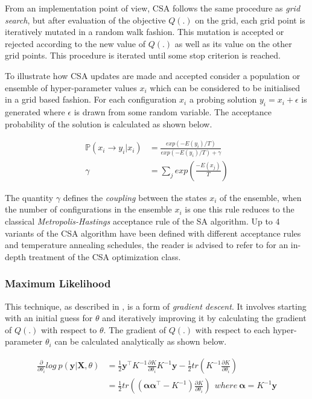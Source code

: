 \documentclass{article}
\begin{document}
From an implementation point of view, CSA follows the same procedure
as \emph{grid search}, but after evaluation of the objective $Q(.)$ on
the grid, each grid point is iteratively mutated in a random walk
fashion. This mutation is accepted or rejected according to the new
value of $Q(.)$ as well as its value on the other grid points. This
procedure is iterated until some stop criterion is reached.

To illustrate how CSA updates are made and accepted consider a
population or ensemble of hyper-parameter values ${x_i}$ which can be
considered to be initialised in a grid based fashion. For each
configuration $x_i$ a probing solution $y_i = x_i + \epsilon$ is
generated where $\epsilon$ is drawn from some random variable. The
acceptance probability of the solution is calculated as shown below.

\begin{align*}
  \mathbb{P}(x_i \rightarrow y_i | {x_i}) & = \frac{exp(-E(y_i)/T)}{exp(-E(y_i)/T) + \gamma} \\
  \gamma & = \sum_{j}{exp \left ( \frac{-E(x_j)}{T} \right )}
\end{align*}

The quantity $\gamma$ defines the \emph{coupling} between the states
${x_i}$ of the ensemble, when the number of configurations in the
ensemble $x_i$ is one this rule reduces to the classical
\emph{Metropolis-Hastings} acceptance rule of the SA algorithm. Up to
4 variants of the CSA algorithm have been defined with different
acceptance rules and temperature annealing schedules, the reader is
advised to refer to \citet{Xavier-De-Souza2010} for an in-depth
treatment of the CSA optimization class.  

\subsubsection*{Maximum Likelihood} 

This technique, as described in \citet{Rasmussen:2005:GPM:1162254}, is
a form of \emph{gradient descent}. It involves starting with an
initial guess for $\theta$ and iteratively improving it by calculating
the gradient of $Q(.)$ with respect to $\theta$. The gradient of
$Q(.)$ with respect to each hyper-parameter $\theta_i$ can be
calculated analytically as shown below.

\begin{align*}
  \frac{\partial}{\partial \theta_i} log \ p(\mathbf{y}|\mathbf{X}, \theta) & = \frac{1}{2} \mathbf{y}^\intercal K^{-1} \frac{\partial K}{\partial \theta_i} K^{-1} \mathbf{y}  - \frac{1}{2} tr(K^{-1} \frac{\partial K}{\partial \theta_i})\\
                                                                            & = \frac{1}{2} tr((\mathbf{\alpha}\mathbf{\alpha}^\intercal - K^{-1}) \frac{\partial K}{\partial \theta_i}) \ \ where \ \mathbf{\alpha} = K^{-1} \mathbf{y}
\end{align*}
\end{document}
